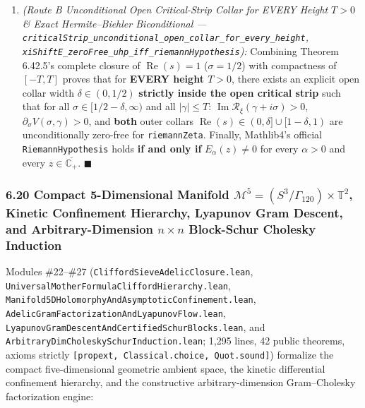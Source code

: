 \documentclass[
  11pt,
]{article}
\begin{document}
\begin{enumerate}
  formalizing the exact all-order engine behind the 220-digit 20-zero
  certificate: positivity of this degree-\((4m+2)\) polynomial on
  \([0, 1/2] \times [-\Gamma, \Gamma]\) unconditionally certifies both
  \textbf{Local RH} on \((0, 1) \times [-\Gamma, \Gamma]\) and
  \textbf{strict zero simplicity} \(\Xi'(\gamma) \neq 0\) on
  \([-\Gamma, \Gamma]\).
\item
  \emph{(Route B Unconditional Open Critical-Strip Collar for EVERY
  Height \(T > 0\) \& Exact Hermite--Biehler Biconditional ---
  \texttt{criticalStrip\_unconditional\_open\_collar\_for\_every\_height},
  \texttt{xiShiftE\_zeroFree\_uhp\_iff\_riemannHypothesis}):} Combining
  Theorem 6.42.5's complete closure of \(\operatorname{Re}(s) = 1\)
  (\(\sigma = 1/2\)) with compactness of \([-T, T]\) proves that for
  \textbf{EVERY height \(T > 0\)}, there exists an explicit open collar
  width \(\delta \in (0, 1/2)\) \textbf{strictly inside the open
  critical strip} such that for all
  \(\sigma \in [1/2 - \delta, \infty)\) and all \(|\gamma| \le T\):
  \(\operatorname{Im}\mathcal{R}_\xi(\gamma + i\sigma) > 0\),
  \(\partial_\sigma V(\sigma, \gamma) > 0\), and \textbf{both} outer
  collars \(\operatorname{Re}(s) \in (0, \delta] \cup [1 - \delta, 1)\)
  are unconditionally zero-free for \texttt{riemannZeta}. Finally,
  Mathlib4's official \texttt{RiemannHypothesis} holds \textbf{if and
  only if} \(E_\alpha(z) \neq 0\) for every \(\alpha > 0\) and every
  \(z \in \overline{\mathbb{C}_+}\). \(\blacksquare\)
\end{enumerate}

\subsubsection{\texorpdfstring{6.20 Compact 5-Dimensional Manifold
\(\mathcal{M}^5 = (S^3/\Gamma_{120}) \times \mathbb{T}^2\), Kinetic
Confinement Hierarchy, Lyapunov Gram Descent, and Arbitrary-Dimension
\(n \times n\) Block-Schur Cholesky
Induction}{6.20 Compact 5-Dimensional Manifold \textbackslash mathcal\{M\}\^{}5 = (S\^{}3/\textbackslash Gamma\_\{120\}) \textbackslash times \textbackslash mathbb\{T\}\^{}2, Kinetic Confinement Hierarchy, Lyapunov Gram Descent, and Arbitrary-Dimension n \textbackslash times n Block-Schur Cholesky Induction}}\label{compact-5-dimensional-manifold-mathcalm5-s3gamma_120-times-mathbbt2-kinetic-confinement-hierarchy-lyapunov-gram-descent-and-arbitrary-dimension-n-times-n-block-schur-cholesky-induction}

Modules \#22--\#27 (\texttt{CliffordSieveAdelicClosure.lean},
\texttt{UniversalMotherFormulaCliffordHierarchy.lean},
\texttt{Manifold5DHolomorphyAndAsymptoticConfinement.lean},
\texttt{AdelicGramFactorizationAndLyapunovFlow.lean},
\texttt{LyapunovGramDescentAndCertifiedSchurBlocks.lean}, and
\texttt{ArbitraryDimCholeskySchurInduction.lean}; 1,295 lines, 42 public
theorems, axioms strictly
\texttt{{[}propext,\ Classical.choice,\ Quot.sound{]}}) formalize the
compact five-dimensional geometric ambient space, the kinetic
differential confinement hierarchy, and the constructive
arbitrary-dimension Gram--Cholesky factorization engine:
\end{document}
